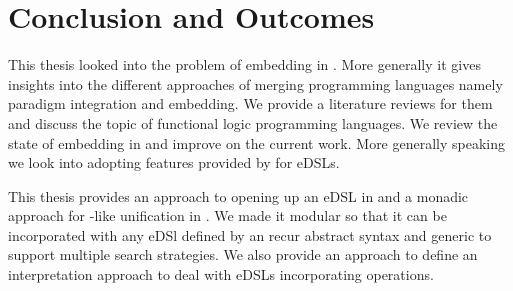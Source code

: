 \documentclass[thesis-solanki.tex]{subfiles}
\begin{document}
\chapter{Conclusion and Outcomes}\label{chap:conclusion}

This thesis looked into the problem of embedding  in . More generally it gives insights into the 
different approaches of merging programming languages namely paradigm integration and embedding. We provide a literature reviews for them
and discuss the topic of functional logic programming languages. We review the state of embedding  in 
and improve on the current work. More generally speaking we look into adopting features provided by  for eDSLs.

This thesis provides an approach to opening up an eDSL in  and a monadic approach for -like unification
in . We made it modular so that it can be incorporated with any eDSl defined by an recur abstract syntax and generic to 
support multiple search strategies. We also provide an approach to define an interpretation approach to deal with eDSLs incorporating 
 operations.


\ifMain
\begin{scope}
  \nolinenumbers
  \enotesize
  \par
  \begin{singlespace}
  \setlength{\parskip}{12pt plus 2pt minus 1pt}
  \theendnotes
  \par
  \end{singlespace}
\end{scope}
\fi
\end{document}
